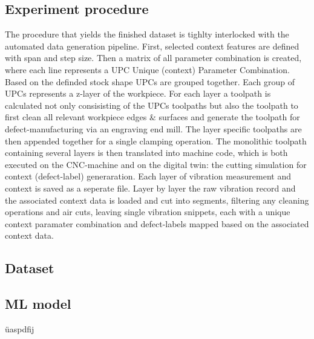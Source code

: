 \documentclass[5p,times,procedia]{elsarticle}
\begin{document}
\subsection{Experiment procedure}
\vspace*{-\baselineskip}
The procedure that yields the finished dataset is tighlty interlocked with the automated data generation pipeline.
First, selected context features are defined with span and step size. Then a matrix of all parameter combination is created, where each line represents a UPC Unique (context) Parameter Combination. 
Based on the definded stock shape UPCs are grouped together. Each group of UPCs represents a z-layer of the workpiece. For each layer a toolpath is calculated not only consisisting of the UPCs toolpaths but also the toolpath to first clean all relevant workpiece edges \& surfaces and generate the toolpath for defect-manufacturing via an engraving end mill.
The layer specific toolpaths are then appended together for a single clamping operation.
The monolithic toolpath containing several layers is then translated into machine code, which is both executed on the CNC-machine and on the digital twin: the cutting simulation for context (defect-label) generaration. Each layer of vibration measurement and context is saved as a seperate file.
Layer by layer the raw vibration record and the associated context data is loaded and cut into segments, filtering any cleaning operations and air cuts, leaving single vibration snippets, each with a unique context paramater combination and defect-labels mapped based on the associated context data.

\subsection{Dataset}
\vspace*{-\baselineskip}


\subsection{ML model}
\vspace*{-\baselineskip}
üaspdfij
\end{document}
